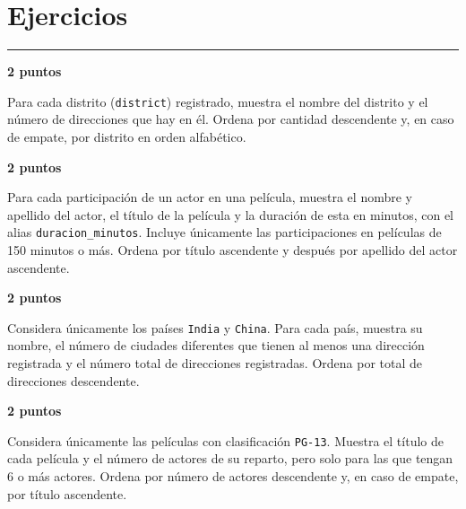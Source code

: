 \documentclass[11pt,a4paper]{article}
\begin{document}
\section*{Ejercicios}\vspace{-3mm}\color{LBcereza}\rule{\textwidth}{0.5pt}\color{LBtexto}
\par\medskip{}\hfill{\color{LBcereza}\bfseries 2 puntos}\par\smallskip
Para cada distrito (\texttt{district}) registrado, muestra el nombre del distrito y el número de direcciones que hay en él. Ordena por cantidad descendente y, en caso de empate, por distrito en orden alfabético.\par\medskip
{}
\par\medskip{}\hfill{\color{LBcereza}\bfseries 2 puntos}\par\smallskip
Para cada participación de un actor en una película, muestra el nombre y apellido del actor, el título de la película y la duración de esta en minutos, con el alias \texttt{duracion\_minutos}. Incluye únicamente las participaciones en películas de 150 minutos o más. Ordena por título ascendente y después por apellido del actor ascendente.\par\medskip
{}
\par\medskip{}\hfill{\color{LBcereza}\bfseries 2 puntos}\par\smallskip
Considera únicamente los países \texttt{India} y \texttt{China}. Para cada país, muestra su nombre, el número de ciudades diferentes que tienen al menos una dirección registrada y el número total de direcciones registradas. Ordena por total de direcciones descendente.\par\medskip
\newpage
{}
\par\medskip{}\hfill{\color{LBcereza}\bfseries 2 puntos}\par\smallskip
Considera únicamente las películas con clasificación \texttt{PG-13}. Muestra el título de cada película y el número de actores de su reparto, pero solo para las que tengan 6 o más actores. Ordena por número de actores descendente y, en caso de empate, por título ascendente.\par\medskip
\end{document}
